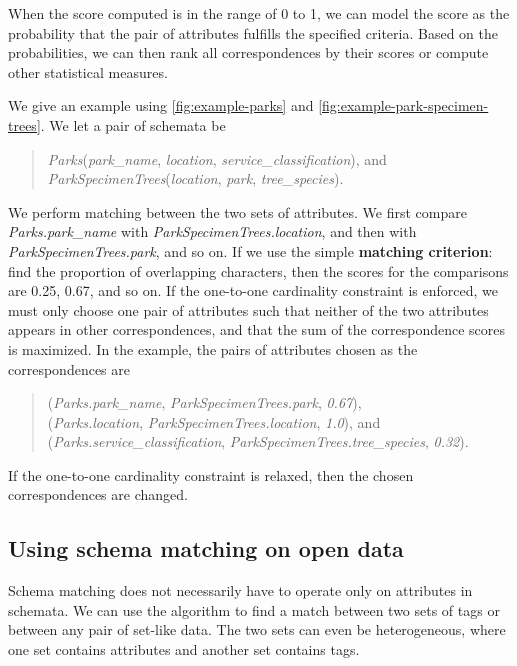 When the score computed is in the range of 0 to 1, we can model the score as the probability that the pair of attributes fulfills the specified criteria. Based on the probabilities, we can then rank all correspondences by their scores or compute other statistical measures.

We give an example using \autoref{fig:example-parks} and \autoref{fig:example-park-specimen-trees}. We let a pair of schemata be
\begin{quote}
    \textit{Parks}(\textit{park\_name}, \textit{location}, \textit{service\_classification}), and \\
    \textit{ParkSpecimenTrees}(\textit{location}, \textit{park}, \textit{tree\_species}).
\end{quote}

We perform matching between the two sets of attributes. We first compare \textit{Parks.park\_name} with \textit{ParkSpecimenTrees.location}, and then with \textit{ParkSpecimenTrees.park}, and so on. If we use the simple \textbf{\gls{matching criterion}}: find the proportion of overlapping characters, then the scores for the comparisons are 0.25, 0.67, and so on. If the one-to-one cardinality constraint is enforced, we must only choose one pair of attributes such that neither of the two attributes appears in other correspondences, and that the sum of the correspondence scores is maximized. In the example, the pairs of attributes chosen as the correspondences are
\begin{quote}
(\textit{Parks.park\_name}, \textit{ParkSpecimenTrees.park}, \textit{0.67}), \\
(\textit{Parks.location}, \textit{ParkSpecimenTrees.location}, \textit{1.0}), and \\
(\textit{Parks.service\_classification}, \textit{ParkSpecimenTrees.tree\_species}, \textit{0.32}).
\end{quote}
If the one-to-one cardinality constraint is relaxed, then the chosen correspondences are changed.

\subsection{Using schema matching on open data}
\label{ssec:UsingSchemaMatchingOnOpenData}

Schema matching does not necessarily have to operate only on attributes in schemata. We can use the algorithm to find a match between two sets of tags or between any pair of set-like data. The two sets can even be heterogeneous, where one set contains attributes and another set contains tags.

